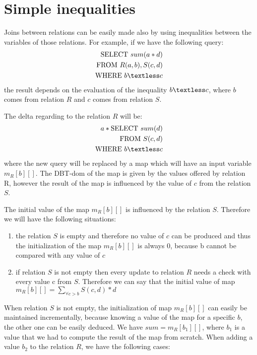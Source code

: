 \documentclass[12pt]{article}
\newcommand{\dom}{\textsf{DBT-dom}}
\begin{document}
\section{Simple inequalities}

Joins between relations can be easily made also by using inequalities between the variables of those relations. For example, if we have the following query:
\begin{align*}
\mbox{SELECT }sum(a*d)\\
\mbox{FROM } R(a,b),S(c,d)\\
\mbox{WHERE } b\textless c 
\end{align*}
the result depends on the evaluation of the inequality $b\textless c$, where $b$ comes from relation $R$ and $c$ comes from relation $S$.

The delta regarding to the relation $R$ will be: 
\begin{align*}
a*\mbox{SELECT }sum(d)\\
\mbox{FROM }S(c,d)\\
\mbox{WHERE } b\textless c 
\end{align*}
where the new query will be replaced by a map which will have an input variable $m_R[b][]$. The \dom{} of the map is given by the values offered by relation R, however the result of the map is influenced by the value of $c$ from the relation $S$.

The initial value of the map $m_R[b][]$ is influenced by the relation $S$. Therefore we will have the following situations:
\begin{enumerate}
\item the relation $S$ is empty and therefore no value of $c$ can be produced and thus the initialization of the map $m_R[b][]$ is always 0, because b cannot be compared with any value of $c$
\item if relation $S$ is not empty then every update to relation $R$  needs a check with every value c from $S$. Therefore we can say that the initial value of map $m_R[b][]=\sum_{\forall c>b} S(c,d)*d$
\end{enumerate}

When relation $S$ is not empty, the initialization of map $m_R[b][]$ can easily be maintained incrementally, because knowing a value of the map for a specific $b$, the other one can be easily deduced. We have $sum=m_R[b_{1}][]$, where $b_{1}$ is a value that we had to compute the result of the map from scratch. When adding a value $b_{2}$ to the relation $R$, we have the following cases:
\end{document}
